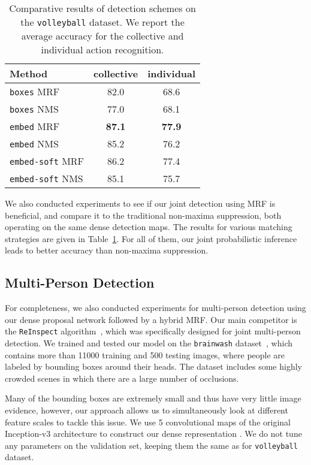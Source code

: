 \documentclass[10pt,twocolumn,letterpaper]{article}
\begin{document}
\begin{table}[ht!]
\begin{center}
\begin{tabular}{|l|c|c|}
\hline
Method                    & collective & individual  \\\hline
\texttt{boxes} MRF  & 82.0 & 68.6  \\
\texttt{boxes} NMS  & 77.0 & 68.1  \\\hline
\texttt{embed} MRF  & \textbf{87.1} & \textbf{77.9}  \\
\texttt{embed} NMS  & 85.2 & 76.2 \\\hline
\texttt{embed-soft} MRF  & 86.2 & 77.4 \\  \texttt{embed-soft} NMS  & 85.1 & 75.7 \\\hline
\end{tabular}
\end{center}
\caption{Comparative results of detection schemes on the \texttt{volleyball}
  dataset. We report the average accuracy for the collective and individual action
  recognition.}
\label{tab:eval:volley-detection}
\vspace{-0.15cm}
\end{table}


We also conducted experiments to see if our joint detection using MRF is
beneficial, and compare it to the traditional non-maxima
suppression, both operating on the same dense detection maps. The results for various
matching strategies are given in Table~\ref{tab:eval:volley-detection}. For all of them, 
our joint probabilistic inference leads to better accuracy than
non-maxima suppression.

\subsection{Multi-Person Detection}

For completeness, we also conducted experiments for multi-person detection using
our dense proposal network followed by a hybrid MRF. Our main competitor is the
 \texttt{ReInspect} algorithm~\cite{Stewart2016}, which was specifically designed for
 joint multi-person detection. We trained and tested our model on the \texttt{brainwash}
dataset~\cite{Stewart2016}, which contains more than 11000 training and 500 testing
images, where people are labeled by bounding boxes around their heads. 
The dataset includes some highly crowded scenes in which there are a large
number of occlusions.

Many of the bounding boxes are extremely small and thus have very little image
evidence, however, our approach allows us to simultaneously look at different
feature scales to tackle this issue. We use 5 convolutional
maps of the original Inception-v3 architecture to construct our dense
representation . We do not tune any parameters on the validation set,
keeping them the same as for \texttt{volleyball} dataset. 
\end{document}
